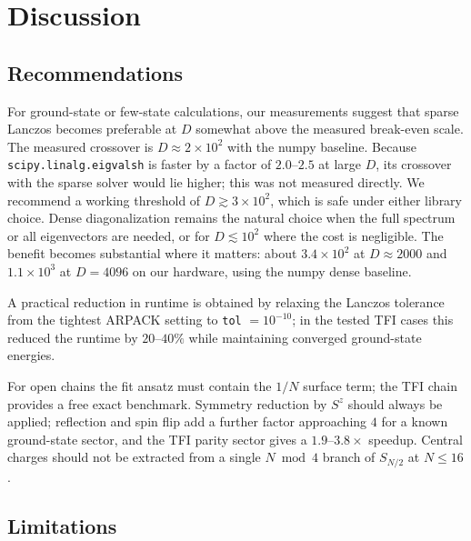 \documentclass[pdflatex,sn-mathphys-num]{sn-jnl}
\begin{document}
\section{Discussion}
\label{sec:discussion}

\subsection{Recommendations}
\label{sec:recs}

For ground-state or few-state calculations, our measurements suggest
that sparse Lanczos becomes preferable at $D$ somewhat above the
measured break-even scale. The measured crossover is
$D \approx 2\times10^{2}$ with the numpy baseline. Because
\texttt{scipy.linalg.eigvalsh} is faster by a factor of $2.0$--$2.5$
at large $D$, its crossover with the sparse solver would lie higher;
this was not measured directly. We recommend a working threshold of
$D \gtrsim 3\times10^{2}$, which is safe under either library choice.
Dense diagonalization remains the natural choice when the full
spectrum or all eigenvectors are needed, or for $D \lesssim 10^{2}$
where the cost is negligible. The benefit becomes substantial where
it matters: about $3.4\times10^{2}$ at $D \approx 2000$ and
$1.1\times10^{3}$ at $D = 4096$ on our hardware, using the numpy
dense baseline.

A practical reduction in runtime is obtained by relaxing the Lanczos
tolerance from the tightest ARPACK setting to \texttt{tol} $=
10^{-10}$; in the tested TFI cases this reduced the runtime by
$20$--$40\%$ while maintaining converged ground-state energies.

For open chains the fit ansatz must contain the $1/N$ surface term;
the TFI chain provides a free exact benchmark. Symmetry reduction by
$S^z$ should always be applied; reflection and spin flip add a further
factor approaching $4$ for a known ground-state sector, and the TFI
parity sector gives a $1.9$--$3.8\times$ speedup. Central charges
should not be extracted from a single $N \bmod 4$ branch of $S_{N/2}$
at $N \le 16$.

\subsection{Limitations}
\label{sec:limitations}
\end{document}
